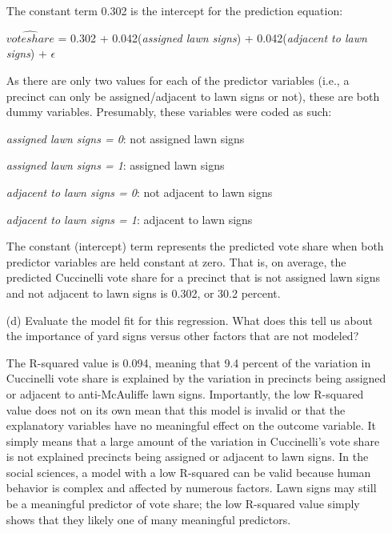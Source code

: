 \documentclass[12pt,letterpaper]{article}
\begin{document}
\begin{enumerate}
	The constant term 0.302 is the intercept for the prediction equation:
	
	$\hat{vote share}$ = 0.302 + 0.042(\textit{assigned lawn signs}) + 0.042(\textit{adjacent to lawn signs})  + $\epsilon$
	
	\vspace{.5cm} As there are only two values for each of the predictor variables (i.e., a precinct can only be assigned/adjacent to lawn signs or not), these are both dummy variables. Presumably, these variables were coded as such:
	
	\textit{assigned lawn signs = 0}: not assigned lawn signs
	
	\textit{assigned lawn signs = 1}: assigned lawn signs
	
	\textit{adjacent to lawn signs = 0}: not adjacent to lawn signs
	
	\textit{adjacent to lawn signs = 1}: adjacent to lawn signs
	
	\vspace{.5cm} The constant (intercept) term represents the predicted vote share when both predictor variables are held constant at zero. That is, on average, the predicted Cuccinelli vote share for a precinct that is not assigned lawn signs and not adjacent to lawn signs is 0.302, or 30.2 percent. 
	
	\vspace{7cm}
	
	\item [(d)] Evaluate the model fit for this regression.  What does this	tell us about the importance of yard signs versus other factors that are not modeled? \vspace{.5cm}
	
	The R-squared value is 0.094, meaning that 9.4 percent of the variation in Cuccinelli vote share is explained by the variation in precincts being assigned or adjacent to anti-McAuliffe lawn signs. Importantly, the low R-squared value does not on its own mean that this model is invalid or that the explanatory variables have no meaningful effect on the outcome variable. It simply means that a large amount of the variation in Cuccinelli's vote share is not explained precincts being assigned or adjacent to lawn signs. In the social sciences, a model with a low R-squared can be valid because human behavior is complex and affected by numerous factors. Lawn signs may still be a meaningful predictor of vote share; the low R-squared value simply shows that they likely one of many meaningful predictors. 
	
\end{enumerate}  
\end{document}
